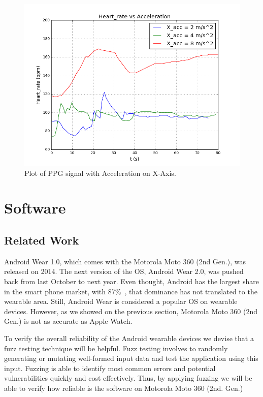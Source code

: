 \documentclass[11pt, draftclsnofoot, onecolumn]{IEEEtran}
\begin{document}
    \begin{figure}[h]	
        \centering
        \includegraphics[scale=0.50]{heart_rate_com} 
        \caption{Plot of PPG signal with Acceleration on X-Axis.}
        \label{fig:HeartRateCom}
    \end{figure}
    
    \section{Software} \label{sec:Software}
    
    \subsection{Related Work} \label{subsec:SoftwareRelatedWork}
    
    Android Wear 1.0, which comes with the Motorola Moto 360 (2nd Gen.), was released on 2014. The next version of the OS, Android Wear 2.0, was pushed back from last October to next year. Even thought, Android has the largest share in the smart phone market, with 87\%~\cite{IDC2016PhoneMarket}, that dominance has not translated to the wearable area. Still, Android Wear is considered a popular OS on wearable devices. However, as we showed on the previous section, Motorola Moto 360 (2nd Gen.) is not as accurate as Apple Watch.
    
   To verify the overall reliability of the Android wearable devices we devise that a fuzz testing technique will be helpful. Fuzz testing involves to randomly generating or mutating well-formed input data and test the application using this input. Fuzzing is able to identify most common errors and potential vulnerabilities quickly and cost effectively. Thus, by applying fuzzing we will be able to verify how reliable is the software on Motorola Moto 360 (2nd. Gen.)
   
\end{document}

